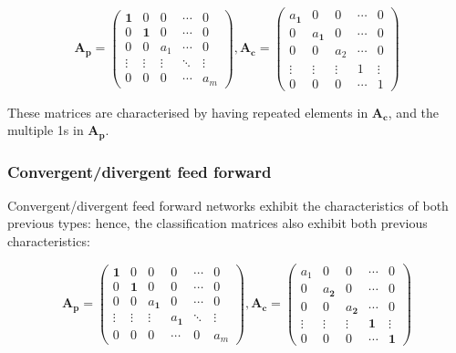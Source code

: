 \begin{equation}
\textbf{A}_{\textbf{p}}=
\begin{pmatrix}
  \textbf{1} & 0 & 0 & \cdots & 0 \\
  0 & \textbf{1} & 0& \cdots & 0 \\
  0 & 0 & a_{1} & \cdots & 0 \\
  \vdots  & \vdots  & \vdots & \ddots & \vdots  \\
  0 & 0 & 0& \cdots & a_{m} 
 \end{pmatrix}
,
\textbf{A}_{\textbf{c}}=
\begin{pmatrix}
  a_{\textbf{1}} & 0 & 0 & \cdots & 0 \\
  0 & a_{\textbf{1}} & 0& \cdots & 0 \\
  0 & 0 & a_{2} & \cdots & 0 \\
  \vdots  & \vdots  & \vdots & 1 & \vdots  \\
  0 & 0 & 0& \cdots & 1 
 \end{pmatrix}
\end{equation} 

These matrices are characterised by having repeated elements in $\textbf{A}_{\textbf{c}}$, and the multiple 1s in $\textbf{A}_{\textbf{p}}$.

\subsubsection{Convergent/divergent feed forward}

Convergent/divergent feed forward networks exhibit the characteristics of both previous types: hence, the classification matrices also exhibit both previous characteristics:

\begin{equation}
\textbf{A}_{\textbf{p}}=
\begin{pmatrix}
  \textbf{1} & 0 & 0 & 0 & \cdots & 0 \\
  0 & \textbf{1} & 0& 0& \cdots & 0 \\
  0 & 0 & a_{\textbf{1}} & 0 &\cdots & 0 \\
  \vdots  & \vdots  &  \vdots & a_{\textbf{1}}  & \ddots & \vdots  \\
  0 & 0 & 0& \cdots & 0 & a_{m} 
 \end{pmatrix}
,
\textbf{A}_{\textbf{c}}=
\begin{pmatrix}
  a_{1} & 0 & 0 & \cdots & 0 \\
  0 & a_{\textbf{2}} & 0& \cdots & 0 \\
  0 & 0 & a_{\textbf{2}} & \cdots & 0 \\
  \vdots  & \vdots  & \vdots & \textbf{1} & \vdots  \\
  0 & 0 & 0& \cdots & \textbf{1} 
 \end{pmatrix}
\end{equation} 


